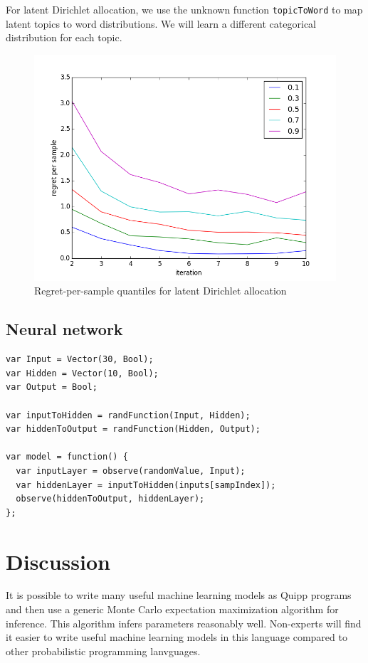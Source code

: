 \documentclass{article}
\begin{document}
For latent Dirichlet allocation, we use the unknown function \texttt{topicToWord} to map latent topics to word distributions.  We will learn a different categorical distribution for each topic.

  \begin{figure}[h]
\begin{center}
  \includegraphics[scale=0.5]{../plots/accuracy_lda.png}
\end{center}
\caption{Regret-per-sample quantiles for latent Dirichlet allocation}
\end{figure}
\subsection{Neural network}

{\small
\begin{lstlisting}
var Input = Vector(30, Bool);
var Hidden = Vector(10, Bool);
var Output = Bool;

var inputToHidden = randFunction(Input, Hidden);
var hiddenToOutput = randFunction(Hidden, Output);

var model = function() {
  var inputLayer = observe(randomValue, Input);
  var hiddenLayer = inputToHidden(inputs[sampIndex]);
  observe(hiddenToOutput, hiddenLayer);
};
\end{lstlisting}
}

  \section{Discussion}

  It is possible to write many useful machine learning models as Quipp programs and then use a generic Monte Carlo expectation maximization algorithm for inference.  This algorithm infers parameters reasonably well.  Non-experts will find it easier to write useful machine learning models in this language compared to other probabilistic programming lanvguages.
  
\end{document}
